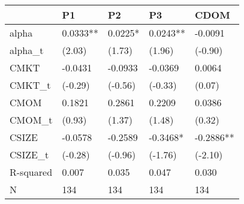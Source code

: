 \begin{tabular}{lllll}
\toprule
 & P1 & P2 & P3 & CDOM \\
\midrule
alpha & 0.0333** & 0.0225* & 0.0243** & -0.0091 \\
alpha_t & (2.03) & (1.73) & (1.96) & (-0.90) \\
CMKT & -0.0431 & -0.0933 & -0.0369 & 0.0064 \\
CMKT_t & (-0.29) & (-0.56) & (-0.33) & (0.07) \\
CMOM & 0.1821 & 0.2861 & 0.2209 & 0.0386 \\
CMOM_t & (0.93) & (1.37) & (1.48) & (0.32) \\
CSIZE & -0.0578 & -0.2589 & -0.3468* & -0.2886** \\
CSIZE_t & (-0.28) & (-0.96) & (-1.76) & (-2.10) \\
R-squared & 0.007 & 0.035 & 0.047 & 0.030 \\
N & 134 & 134 & 134 & 134 \\
\bottomrule
\end{tabular}
